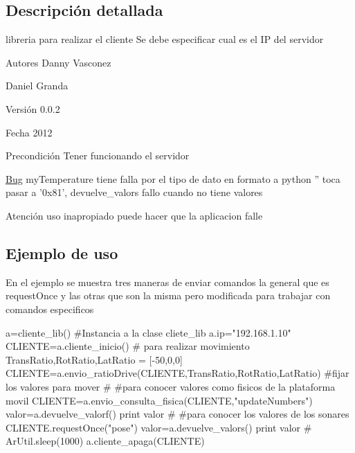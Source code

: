 \subsection{Descripción detallada}
libreria para realizar el cliente Se debe especificar cual es el IP del servidor \begin{DoxyAuthor}{Autores}
Danny Vasconez 

Daniel Granda 
\end{DoxyAuthor}
\begin{DoxyVersion}{Versión}
0.0.2 
\end{DoxyVersion}
\begin{DoxyDate}{Fecha}
2012 
\end{DoxyDate}
\begin{DoxyPrecond}{Precondición}
Tener funcionando el servidor 
\end{DoxyPrecond}
\begin{Desc}
\item[\hyperlink{bug__bug000001}{Bug}]myTemperature tiene falla por el tipo de dato en formato a python '' toca pasar a '0x81', devuelve\_\-valors fallo cuando no tiene valores \end{Desc}
\begin{DoxyWarning}{Atención}
uso inapropiado puede hacer que la aplicacion falle
\end{DoxyWarning}
\hypertarget{index_intro}{}\subsection{Ejemplo de uso}\label{index_intro}
En el ejemplo se muestra tres maneras de enviar comandos la general que es requestOnce y las otras que son la misma pero modificada para trabajar con comandos especificos 
\begin{DoxyVerbInclude}
a=cliente_lib() #Instancia a la clase cliete_lib
a.ip="192.168.1.10"
CLIENTE=a.cliente_inicio() 
# para realizar movimiento 
TransRatio,RotRatio,LatRatio = [-50,0,0]
CLIENTE=a.envio_ratioDrive(CLIENTE,TransRatio,RotRatio,LatRatio) #fijar los valores para mover
#
#para conocer valores como fisicos de la plataforma movil
CLIENTE=a.envio_consulta_fisica(CLIENTE,"updateNumbers")
valor=a.devuelve_valorf()
print valor
#
#para conocer los valores de los sonares
CLIENTE.requestOnce("pose")
valor=a.devuelve_valors()
print valor
#
ArUtil.sleep(1000)
a.cliente_apaga(CLIENTE)

\end{DoxyVerbInclude}


